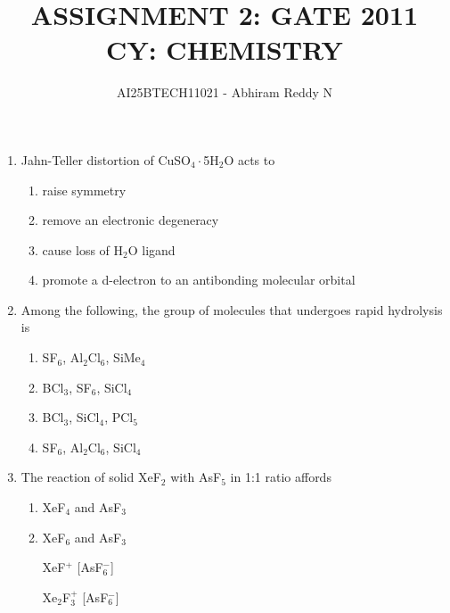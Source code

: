 \documentclass[journal,12pt,onecolumn]{IEEEtran}
\theoremstyle{remark}
\begin{document}
\title{
ASSIGNMENT 2: GATE 2011 \\
CY: CHEMISTRY}
\author{AI25BTECH11021 - Abhiram Reddy N}
\maketitle


\begin{enumerate} 


\item    Jahn-Teller distortion of CuSO$_4\cdot$5H$_2$O acts to \hfill{}
 

\begin{multicols}{2}
\begin{enumerate}
\item raise symmetry  
\item remove an electronic degeneracy  
\item cause loss of H$_2$O ligand  
\item promote a d-electron to an antibonding molecular orbital  
\end{enumerate}
\end{multicols}
 

\item    Among the following, the group of molecules that undergoes rapid hydrolysis is \hfill{}
 

\begin{multicols}{2}
\begin{enumerate}
\item SF$_6$, Al$_2$Cl$_6$, SiMe$_4$  
\item BCl$_3$, SF$_6$, SiCl$_4$  
\item BCl$_3$, SiCl$_4$, PCl$_5$  
\item SF$_6$, Al$_2$Cl$_6$, SiCl$_4$  
\end{enumerate}
\end{multicols}
 

\item    The reaction of solid XeF$_2$ with AsF$_5$ in 1:1 ratio affords \hfill{}
 

\begin{multicols}{2}
\begin{enumerate}
\item XeF$_4$ and AsF$_3$  
\item XeF$_6$ and AsF$_3$  
\item [XeF$^+$][AsF$_6^-$]  
\item [Xe$_2$F$_3^+$][AsF$_6^-$]  
\end{enumerate}
\end{multicols}
 


\end{enumerate}
\end{document}
